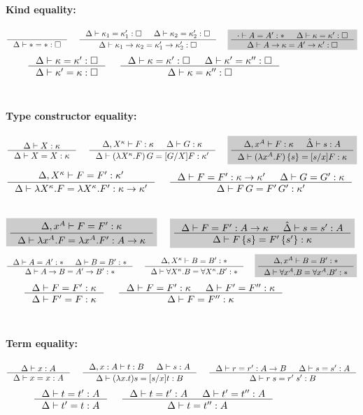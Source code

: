 \begin{figure}
\begin{framed}
\paragraph{Kind equality:}
\[ \inference{}{\Delta |- * = *:\square}
 ~~~~
   \inference{ \Delta |- \kappa_1 = \kappa_1' : \square
             & \Delta |- \kappa_2 = \kappa_2' : \square }
             {\Delta |- \kappa_1 -> \kappa_2 = \kappa_1' -> \kappa_2' : \square}
 ~~~~ \newFi{
   \inference{\cdot |- A=A':* & \Delta |- \kappa=\kappa':\square}
             {\Delta |- A -> \kappa = A' -> \kappa' : \square} }
\]
\[ \inference{\Delta |- \kappa=\kappa':\square}
             {\Delta |- \kappa'=\kappa:\square}
 ~~~~
   \inference{ \Delta |- \kappa =\kappa' :\square
             & \Delta |- \kappa'=\kappa'':\square}
             {\Delta |- \kappa=\kappa'':\square}
\]
~\\
\paragraph{Type constructor equality:}
\[ \inference{\Delta |- X:\kappa }{\Delta |- X=X:\kappa}
 ~~~~
   \inference{\Delta,X^\kappa |- F:\kappa & \Delta |- G:\kappa}
             {\Delta |- (\lambda X^\kappa.F)\,G = [G/X]F:\kappa'}
 ~~~~ \newFi{
   \inference{\Delta,x^A |- F:\kappa & \hat\Delta |- s:A}
             {\Delta |- (\lambda x^A.F)\,\{s\} = [s/x]F:\kappa} }
\]
\[ \inference{\Delta,X^\kappa |- F=F' : \kappa'}
             {\Delta |- \lambda X^\kappa.F=\lambda X^\kappa.F':\kappa-> \kappa'}
 ~~~~
   \inference{\Delta |- F=F':\kappa->\kappa' & \Delta |- G=G':\kappa}
             {\Delta |- F\,G = F'\,G' : \kappa'}
\]
 ~~~~
\[ \newFi{
   \inference{\Delta,x^A |- F=F' : \kappa}
             {\Delta |- \lambda x^A.F=\lambda x^A.F' : A -> \kappa} }
 ~~~~ \newFi{
   \inference{\Delta |- F=F':A->\kappa & \hat\Delta |- s=s':A}
             {\Delta |- F\,\{s\} = F'\,\{s'\} : \kappa} }
\]
\[ \inference{\Delta |- A=A':* & \Delta |- B=B':*}{\Delta |- A-> B=A'-> B':*}
 ~~~~
   \inference{\Delta,X^\kappa |- B=B':*}
             {\Delta |- \forall X^\kappa.B=\forall X^\kappa.B':*}
 ~~~~ \newFi{
   \inference{\Delta,x^A |- B=B':*}
             {\Delta |- \forall x^A.B=\forall x^A.B':*} }
\]
\[ \inference{\Delta |- F = F' : \kappa}{\Delta |- F' = F : \kappa}
 ~~~~
   \inference{\Delta |- F = F' : \kappa & \Delta |- F' = F'' : \kappa}
             {\Delta |- F = F'' : \kappa}
\]
~\\
\paragraph{Term equality:}
\[ \inference{\Delta |- x:A}{\Delta |- x=x:A}
 ~~~~
   \inference{\Delta,x:A |- t:B & \Delta |- s:A}
             {\Delta |- (\lambda x.t)s=[s/x]t : B}
 ~~~~
   \inference{\Delta |- r=r':A-> B & \Delta |- s=s':A}{\Delta |- r\;s=r'\;s':B}
\]
\[ \inference{\Delta |- t=t':A}{\Delta |- t'=t:A}
 ~~~~
   \inference{\Delta |- t=t':A & \Delta |- t'=t'':A}{\Delta |- t=t'':A}
\]
~\\

\end{framed}
\end{figure}
